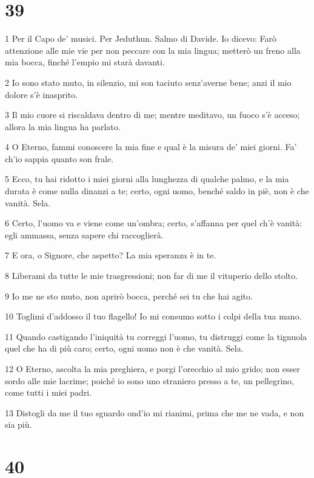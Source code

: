 \chapter{39}

\par 1 Per il Capo de' musici. Per Jeduthun. Salmo di Davide. Io dicevo: Farò attenzione alle mie vie per non peccare con la mia lingua; metterò un freno alla mia bocca, finché l'empio mi starà davanti.
\par 2 Io sono stato muto, in silenzio, mi son taciuto senz'averne bene; anzi il mio dolore s'è inasprito.
\par 3 Il mio cuore si riscaldava dentro di me; mentre meditavo, un fuoco s'è acceso; allora la mia lingua ha parlato.
\par 4 O Eterno, fammi conoscere la mia fine e qual è la misura de' miei giorni. Fa' ch'io sappia quanto son frale.
\par 5 Ecco, tu hai ridotto i miei giorni alla lunghezza di qualche palmo, e la mia durata è come nulla dinanzi a te; certo, ogni uomo, benché saldo in piè, non è che vanità. Sela.
\par 6 Certo, l'uomo va e viene come un'ombra; certo, s'affanna per quel ch'è vanità: egli ammassa, senza sapere chi raccoglierà.
\par 7 E ora, o Signore, che aspetto? La mia speranza è in te.
\par 8 Liberami da tutte le mie trasgressioni; non far di me il vituperio dello stolto.
\par 9 Io me ne sto muto, non aprirò bocca, perché sei tu che hai agito.
\par 10 Toglimi d'addosso il tuo flagello! Io mi consumo sotto i colpi della tua mano.
\par 11 Quando castigando l'iniquità tu correggi l'uomo, tu distruggi come la tignuola quel che ha di più caro; certo, ogni uomo non è che vanità. Sela.
\par 12 O Eterno, ascolta la mia preghiera, e porgi l'orecchio al mio grido; non esser sordo alle mie lacrime; poiché io sono uno straniero presso a te, un pellegrino, come tutti i miei padri.
\par 13 Distogli da me il tuo sguardo ond'io mi rianimi, prima che me ne vada, e non sia più.

\chapter{40}

